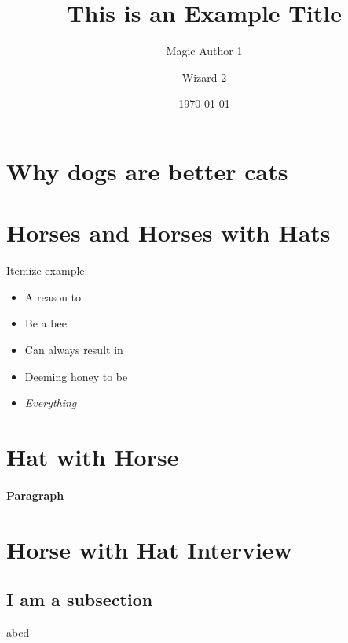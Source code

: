 \documentclass[a3paper, protrait, english]{uulm-cs-poster}
\title{This is an Example Title}
\author{Magic Author 1\and Wizard 2}
\institute{The Amazing Institute}
\date{\today}
\begin{document}
\maketitle
\section*{Why dogs are better cats}
\lipsum[2]
\vfil
\begin{multicols}{3}
\section*{Horses and Horses with Hats}
   \lipsum[1-3]
   Itemize example:
   \begin{itemize}
      \item A reason to
      \item Be a bee
      \item Can always result in
      \item Deeming honey to be
      \item \textit{Everything}
   \end{itemize}
\section*{Hat with Horse}
   \lipsum[4-6]
   \paragraph{Paragraph}\lipsum[7]
\end{multicols}
\lipsum[2]
\section*{Horse with Hat Interview}
\begin{multicols}{4}
   \lipsum[2]
   \subsection*{I am a subsection}
   abcd
\end{multicols}
\end{document}
